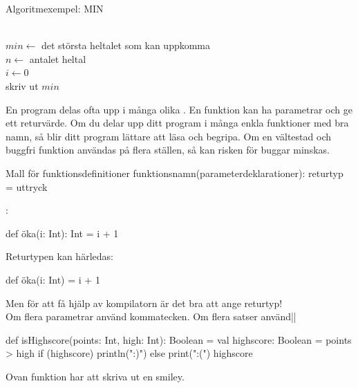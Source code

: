 \begin{Slide}{Algoritmexempel: MIN}
\begin{algorithm}[H]

 ~\\
 $min \leftarrow$ det största heltalet som kan uppkomma  \\
 $n \leftarrow $ antalet heltal \\
 $i \leftarrow 0$ \\
 skriv ut $min$
\end{algorithm}
\end{Slide}



\ifkompendium
\noindent En program delas ofta upp i många olika . En funktion kan ha parametrar och ge ett returvärde. Om du delar upp ditt program i många enkla funktioner med bra namn, så blir ditt program lättare att läsa och begripa. Om en vältestad och buggfri funktion användas på flera ställen, så kan risken för buggar minskas.
\fi 

\begin{Slide}{Mall för funktionsdefinitioner}
\SlideFontSmall
{} funktionsnamn(parameterdeklarationer): returtyp = uttryck

\pause\vspace{0.5em}:

\begin{Code}[basicstyle=\ttfamily\fontsize{9}{11}\selectfont]
def öka(i: Int): Int = i + 1
\end{Code}
\pause Returtypen kan härledas:
\begin{Code}[basicstyle=\ttfamily\fontsize{9}{11}\selectfont]
def öka(i: Int) = i + 1
\end{Code}
Men för att få hjälp av kompilatorn är det bra att ange returtyp!\\
\pause Om flera parametrar använd kommatecken. Om flera satser använd\code|{}|
\begin{Code}[basicstyle=\ttfamily\fontsize{9}{11}\selectfont]
def isHighscore(points: Int, high: Int): Boolean = {
  val highscore: Boolean = points > high
  if (highscore) println(":)") else print(":(")
  highscore
}
\end{Code}
\pause Ovan funktion har  att skriva ut en smiley.
\end{Slide}


